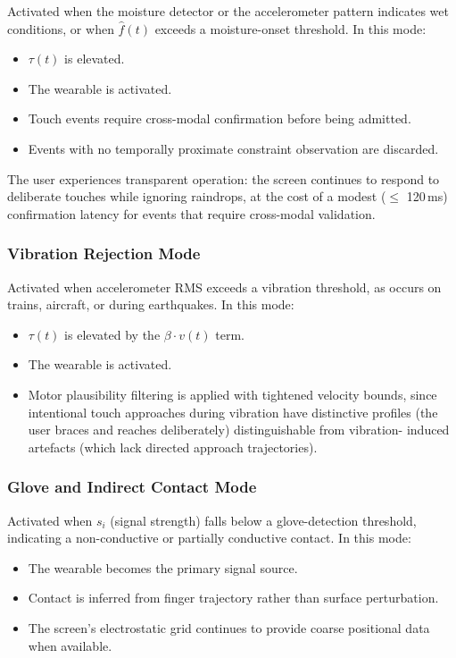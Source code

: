 \documentclass[11pt,letterpaper]{article}
\begin{document}
Activated when the moisture detector or the accelerometer pattern indicates wet
conditions, or when $\hat{f}(t)$ exceeds a moisture-onset threshold. In this mode:

\begin{itemize}[leftmargin=2em]
  \item $\tau(t)$ is elevated.
  \item The wearable is activated.
  \item Touch events require cross-modal confirmation before being admitted.
  \item Events with no temporally proximate constraint observation are discarded.
\end{itemize}

The user experiences transparent operation: the screen continues to respond to
deliberate touches while ignoring raindrops, at the cost of a modest ($\leq$
120\,ms) confirmation latency for events that require cross-modal validation.

\subsubsection{Vibration Rejection Mode}

Activated when accelerometer RMS exceeds a vibration threshold, as occurs on trains,
aircraft, or during earthquakes. In this mode:

\begin{itemize}[leftmargin=2em]
  \item $\tau(t)$ is elevated by the $\beta \cdot v(t)$ term.
  \item The wearable is activated.
  \item Motor plausibility filtering is applied with tightened velocity bounds,
        since intentional touch approaches during vibration have distinctive profiles
        (the user braces and reaches deliberately) distinguishable from vibration-
        induced artefacts (which lack directed approach trajectories).
\end{itemize}

\subsubsection{Glove and Indirect Contact Mode}

Activated when $s_i$ (signal strength) falls below a glove-detection threshold,
indicating a non-conductive or partially conductive contact. In this mode:

\begin{itemize}[leftmargin=2em]
  \item The wearable becomes the primary signal source.
  \item Contact is inferred from finger trajectory rather than surface perturbation.
  \item The screen's electrostatic grid continues to provide coarse positional data
        when available.
\end{itemize}
\end{document}
